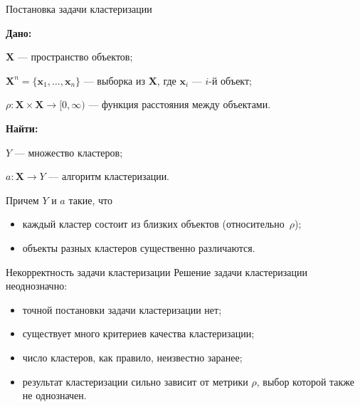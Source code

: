 \documentclass[unicode, notheorems, handout]{beamer}
\begin{document}
\begin{frame}{Постановка задачи кластеризации}
    
  \textbf{Дано:}
   \vspace{0.5ex}
   
 $\pmb{X} $ ---  пространство объектов;
 \vspace{0.5ex}
    
$\pmb{X}^n = \{\pmb{x}_1, \dots, \pmb{x}_n\}$ --- выборка из $\pmb{X}$, где $\pmb{x}_i$ --- $i$-й объект;
\vspace{0.5ex}
     
$\rho: \pmb{X} \times \pmb{X} \to [0, \infty)$ --- функция расстояния между объектами.
\vspace{2ex}

\textbf{Найти:}
 \vspace{0.5ex}
  
 $Y$ ---  множество кластеров;
 \vspace{0.5ex}
 
 $a: \pmb{X} \rightarrow Y$ ---  алгоритм кластеризации. 
  \vspace{0.8ex}


  Причем $Y$ и $a$ такие, что 

  \begin{itemize}
      \item каждый кластер состоит из близких объектов (относительно~$\rho$);
      \item объекты разных кластеров существенно различаются.
  \end{itemize}
\end{frame}

\begin{frame}{Некорректность задачи кластеризации}
    Решение задачи кластеризации неоднозначно:
  \vspace{1ex}
  
    \begin{itemize}
        \item точной постановки задачи кластеризации нет;
        \vspace{0.5ex}
        
        \item существует много критериев качества кластеризации;
          \vspace{0.5ex}
          
        \item число кластеров, как правило, неизвестно заранее;
          \vspace{0.5ex}
          
        \item результат кластеризации сильно зависит от метрики $\rho$, выбор которой также не однозначен.
    \end{itemize}
\end{frame}
\end{document}
